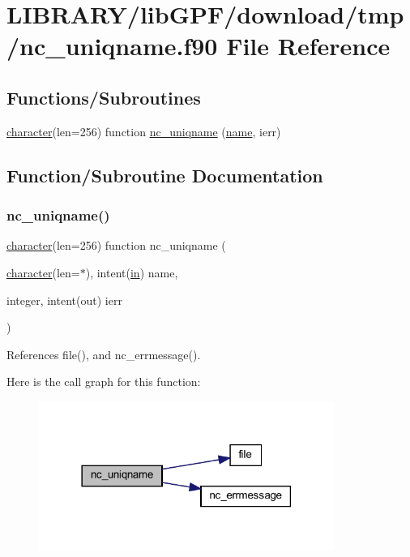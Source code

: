 \hypertarget{nc__uniqname_8f90}{}\section{L\+I\+B\+R\+A\+R\+Y/lib\+G\+P\+F/download/tmp/nc\+\_\+uniqname.f90 File Reference}
\label{nc__uniqname_8f90}
\subsection*{Functions/\+Subroutines}
\begin{DoxyCompactItemize}
\item 
\hyperlink{option__stopwatch_83_8txt_abd4b21fbbd175834027b5224bfe97e66}{character}(len=256) function \hyperlink{nc__uniqname_8f90_a0a9bfa958469b0b0415ecb52d36bdb92}{nc\+\_\+uniqname} (\hyperlink{M__stopwatch_83_8txt_a3f508a893ae4c3b397b4383e33b9bcae}{name}, ierr)
\end{DoxyCompactItemize}


\subsection{Function/\+Subroutine Documentation}
\mbox{\label{nc__uniqname_8f90_a0a9bfa958469b0b0415ecb52d36bdb92}} 
\subsubsection{\texorpdfstring{nc\+\_\+uniqname()}{nc\_uniqname()}}
{\footnotesize\ttfamily \hyperlink{option__stopwatch_83_8txt_abd4b21fbbd175834027b5224bfe97e66}{character}(len=256) function nc\+\_\+uniqname (\begin{DoxyParamCaption}\item[{\hyperlink{option__stopwatch_83_8txt_abd4b21fbbd175834027b5224bfe97e66}{character}(len=$\ast$), intent(\hyperlink{M__journal_83_8txt_afce72651d1eed785a2132bee863b2f38}{in})}]{name,  }\item[{integer, intent(out)}]{ierr }\end{DoxyParamCaption})}



References file(), and nc\+\_\+errmessage().

Here is the call graph for this function\+:
\nopagebreak
\begin{figure}[H]
\begin{center}
\leavevmode
\includegraphics[width=273pt]{nc__uniqname_8f90_a0a9bfa958469b0b0415ecb52d36bdb92_cgraph}
\end{center}
\end{figure}
